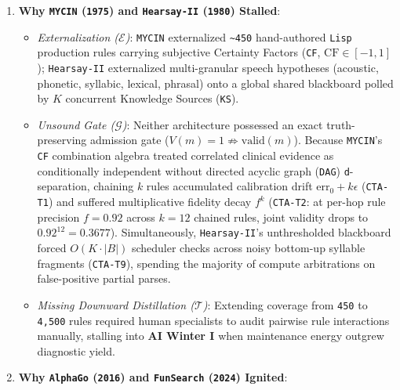 \documentclass[10pt,letterpaper]{article}
\providecommand{\tightlist}{\setlength{\itemsep}{1pt}\setlength{\parskip}{0pt}}
\begin{document}
\begin{enumerate}
\def\labelenumi{\arabic{enumi}.}
\tightlist
\item
  \textbf{Why \texttt{MYCIN} (\texttt{1975}) and \texttt{Hearsay-\allowbreak{}II}
  (\texttt{1980}) Stalled}:

  \begin{itemize}
  \tightlist
  \item
    \emph{Externalization (\(\mathcal{E}\))}: \texttt{MYCIN}
    externalized \texttt{\textasciitilde{}450} hand-authored
    \texttt{Lisp} production rules carrying subjective Certainty Factors
    (\texttt{CF}, \(\mathrm{CF} \in [-1, 1]\)); \texttt{Hearsay-\allowbreak{}II}
    externalized multi-granular speech hypotheses (acoustic, phonetic,
    syllabic, lexical, phrasal) onto a global shared blackboard polled
    by \(K\) concurrent Knowledge Sources (\texttt{KS}).
  \item
    \emph{Unsound Gate (\(\mathcal{G}\))}: Neither architecture
    possessed an exact truth-preserving admission gate
    (\(V(m) = 1 \not\Rightarrow \text{valid}(m)\)). Because
    \texttt{MYCIN}'s \texttt{CF} combination algebra treated correlated
    clinical evidence as conditionally independent without directed
    acyclic graph (\texttt{DAG}) \texttt{d}-separation, chaining \(k\)
    rules accumulated calibration drift \(\mathrm{err}_0 + k\epsilon\)
    (\texttt{CTA-T1}) and suffered multiplicative fidelity decay \(f^k\)
    (\texttt{CTA-T2}: at per-hop rule precision \(f = 0.92\) across
    \(k = 12\) chained rules, joint validity drops to
    \(0.92^{12} = 0.3677\)). Simultaneously, \texttt{Hearsay-\allowbreak{}II}'s
    unthresholded blackboard forced \(O(K \cdot |B|)\) scheduler checks
    across noisy bottom-up syllable fragments (\texttt{CTA-T9}),
    spending the majority of compute arbitrations on false-positive
    partial parses.
  \item
    \emph{Missing Downward Distillation (\(\mathcal{T}\))}: Extending
    coverage from \texttt{450} to \texttt{4,500} rules required human
    specialists to audit pairwise rule interactions manually, stalling
    into \textbf{AI Winter I} when maintenance energy outgrew diagnostic
    yield.
  \end{itemize}
\item
  \textbf{Why \texttt{AlphaGo} (\texttt{2016}) and \texttt{FunSearch}
  (\texttt{2024}) Ignited}:


\end{enumerate}
\end{document}
